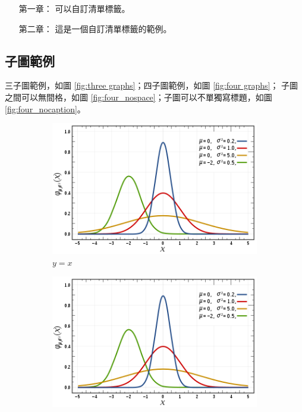 \begin{enumerate} [leftmargin=3cm]      %
    \item[第一章：] 可以自訂清單標籤。
    \item[第二章：] 這是一個自訂清單標籤的範例。
\end{enumerate}


\subsection{子圖範例}

三子圖範例，如圖 \ref{fig:three graphs}；四子圖範例，如圖 \ref{fig:four graphs}；
子圖之間可以無間格，如圖 \ref{fig:four_nospace}；子圖可以不單獨寫標題，如圖 \ref{fig:four_nocaption}。

\begin{figure}[!htb]
    \centering
    \begin{subfigure}[b]{0.3\textwidth}
        \centering
        \includegraphics[width=\textwidth]{figures/gambar.png}
        \caption{$y=x$}
        \label{fig:y equals x}
    \end{subfigure}
    \hfill
    \begin{subfigure}[b]{0.3\textwidth}
        \centering
        \includegraphics[width=\textwidth]{figures/gambar.png}

\end{subfigure}
\end{figure}
